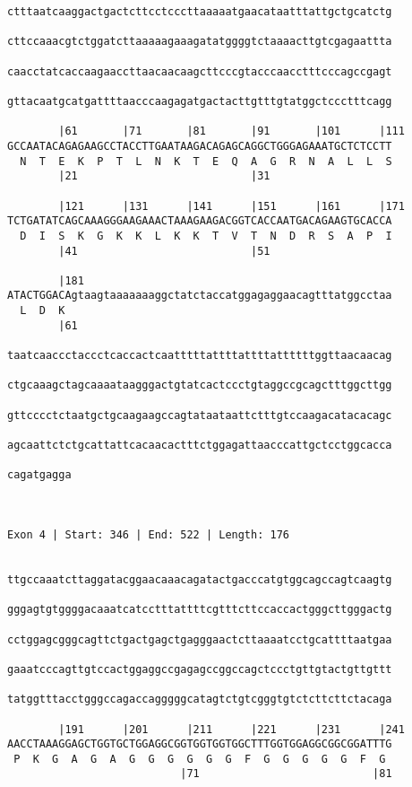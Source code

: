 \documentclass{article}
\begin{document}
\begin{Verbatim}
ctttaatcaaggactgactcttcctcccttaaaaatgaacataatttattgctgcatctg
                                                            
cttccaaacgtctggatcttaaaaagaaagatatggggtctaaaacttgtcgagaattta
                                                            
caacctatcaccaagaaccttaacaacaagcttcccgtacccaacctttcccagccgagt
                                                            
gttacaatgcatgattttaacccaagagatgactacttgtttgtatggctccctttcagg
                                                            
        |61       |71       |81       |91       |101      |111
GCCAATACAGAGAAGCCTACCTTGAATAAGACAGAGCAGGCTGGGAGAAATGCTCTCCTT
  N  T  E  K  P  T  L  N  K  T  E  Q  A  G  R  N  A  L  L  S
        |21                           |31                   
  
        |121      |131      |141      |151      |161      |171
TCTGATATCAGCAAAGGGAAGAAACTAAAGAAGACGGTCACCAATGACAGAAGTGCACCA
  D  I  S  K  G  K  K  L  K  K  T  V  T  N  D  R  S  A  P  I
        |41                           |51                   
  
        |181                                                
ATACTGGACAgtaagtaaaaaaaggctatctaccatggagaggaacagtttatggcctaa
  L  D  K                                                   
        |61
  
taatcaaccctaccctcaccactcaatttttattttattttattttttggttaacaacag

ctgcaaagctagcaaaataagggactgtatcactccctgtaggccgcagctttggcttgg

gttcccctctaatgctgcaagaagccagtataataattctttgtccaagacatacacagc

agcaattctctgcattattcacaacactttctggagattaacccattgctcctggcacca

cagatgagga
          

 
Exon 4 | Start: 346 | End: 522 | Length: 176


ttgccaaatcttaggatacggaacaaacagatactgacccatgtggcagccagtcaagtg

gggagtgtggggacaaatcatcctttattttcgtttcttccaccactgggcttgggactg

cctggagcgggcagttctgactgagctgagggaactcttaaaatcctgcattttaatgaa

gaaatcccagttgtccactggaggccgagagccggccagctccctgttgtactgttgttt

tatggtttacctgggccagaccagggggcatagtctgtcgggtgtctcttcttctacaga

        |191      |201      |211      |221      |231      |241
AACCTAAAGGAGCTGGTGCTGGAGGCGGTGGTGGTGGCTTTGGTGGAGGCGGCGGATTTG
 P  K  G  A  G  A  G  G  G  G  G  G  F  G  G  G  G  G  F  G 
                           |71                           |81
  

\end{Verbatim}
\end{document}
